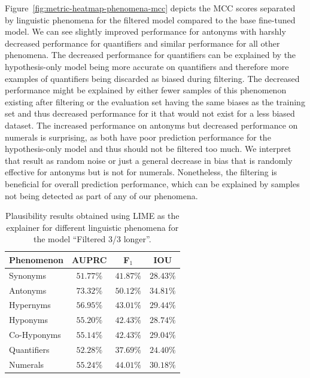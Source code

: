Figure~\ref{fig:metric-heatmap-phenomena-mcc} depicts the \ac{MCC} scores separated by linguistic phenomena for the filtered model compared to the base fine-tuned model. We can see slightly improved performance for antonyms with harshly decreased performance for quantifiers and similar performance for all other phenomena. The decreased performance for quantifiers can be explained by the hypothesis-only model being more accurate on quantifiers and therefore more examples of quantifiers being discarded as biased during filtering. The decreased performance might be explained by either fewer samples of this phenomenon existing after filtering or the evaluation set having the same biases as the training set and thus decreased performance for it that would not exist for a less biased dataset. The increased performance on antonyms but decreased performance on numerals is surprising, as both have poor prediction performance for the hypothesis-only model and thus should not be filtered too much. We interpret that result as random noise or just a general decrease in bias that is randomly effective for antonyms but is not for numerals. Nonetheless, the filtering is beneficial for overall prediction performance, which can be explained by samples not being detected as part of any of our phenomena.

\begin{table}[ht!]
    \centering
    \caption{Plausibility results obtained using \ac{LIME} as the explainer for different linguistic phenomena for the model \enquote{Filtered 3/3 longer}.}
    \begin{tabular}{l c c c}
        \toprule
        \multicolumn{1}{c}{Phenomenon} & \acs{AUPRC} & F$_1$ & \acs{IOU}\\
        \midrule
        Synonyms & $51.77\%$ & $41.87\%$ & $28.43\%$ \\
        Antonyms & $73.32\%$ & $50.12\%$ & $34.81\%$ \\
        Hypernyms & $56.95\%$ & $43.01\%$ & $29.44\%$ \\
        Hyponyms & $55.20\%$ & $42.43\%$ & $28.74\%$ \\
        Co-Hyponyms & $55.14\%$ & $42.43\%$ & $29.04\%$ \\
        Quantifiers & $52.28\%$ & $37.69\%$ & $24.40\%$ \\
        Numerals & $55.24\%$ & $44.01\%$ & $30.18\%$ \\
        \bottomrule
    \end{tabular}
    \label{tab:res:bias_filtered}
\end{table}

